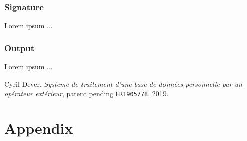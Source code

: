 \documentclass[twoside,twocolumn]{article}
\theoremstyle{definition}
\theoremstyle{remark}
\begin{document}
\subsubsection{Signature}

Lorem ipsum ...

\subsubsection{Output}

Lorem ipsum ...

\tableofcontents %


\begin{thebibliography}{99} %

Cyril Dever. \emph{Système de traitement d'une base de données personnelle par un opérateur extérieur}, patent pending \texttt{FR1905778}, 2019.

\end{thebibliography}


\onecolumn
\section*{Appendix}
\end{document}
